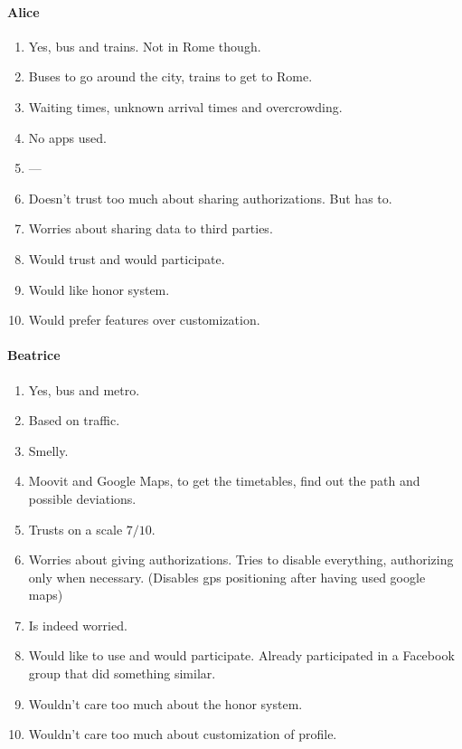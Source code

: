 \documentclass[a4paper, 11pt, twocolumn]{article}
\begin{document}
\paragraph*{Alice}
\begin{enumerate}
	\item Yes, bus and trains. Not in Rome though.
	\item Buses to go around the city, trains to get to Rome.
	\item Waiting times, unknown arrival times and overcrowding.
	\item No apps used.
	\item ---
	\item Doesn't trust too much about sharing authorizations. But has to.
	\item Worries about sharing data to third parties.
	\item Would trust and would participate.
	\item Would like honor system.
	\item Would prefer features over customization.
\end{enumerate}


\paragraph*{Beatrice}

\begin{enumerate}
	\item Yes, bus and metro.
	\item Based on traffic.
	\item Smelly.
	\item Moovit and Google Maps, to get the timetables, find out the path and possible deviations.
	\item Trusts on a scale $7/10$.
	\item Worries about giving authorizations. Tries to disable everything, authorizing only when necessary. (Disables gps positioning after having used google maps)
	\item Is indeed worried.
	\item Would like to use and would participate. Already participated in a Facebook group that did something similar.
	\item Wouldn't care too much about the honor system.
	\item Wouldn't care too much about customization of profile.
\end{enumerate}
\end{document}
